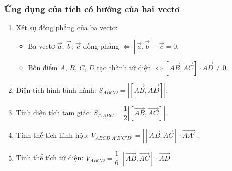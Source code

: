 \subsubsection{Ứng dụng của tích có hướng của hai vectơ}
	\begin{enumerate}
		\item Xét sự đồng phẳng của ba vectơ:
		\begin{itemize}
			\item Ba vectơ $\vec{a}$; $\vec{b}$; $\vec{c}$ đồng phẳng $\Leftrightarrow \left[ \vec{a},\vec{b} \right]\cdot \vec{c}=0$.
			\item Bốn điểm $A$, $B$, $C$, $D$ tạo thành tứ diện $\Leftrightarrow \left[ \vec{AB},\vec{AC} \right]\cdot \vec{AD}\ne 0$.
		\end{itemize}
		\item Diện tích hình bình hành: $S_{ABCD}=\left| \left[ \vec{AB},\vec{AD} \right] \right|$.
		\item Tính diện tích tam giác: $S_{\triangle ABC}=\dfrac{1}{2}\left| \left[ \vec{AB},\vec{AC} \right] \right|$.
		\item Tính thể tích hình hộp: $V_{ABCD.A'B'C'D'}=\left| \left[ \vec{AB},\vec{AC} \right]\cdot\vec{AA'} \right|$.
		\item Tính thể tích tứ diện: $V_{ABCD}=\dfrac{1}{6}\left| \left[ \vec{AB},\vec{AC} \right]\cdot \vec{AD} \right|$.
	\end{enumerate} 
